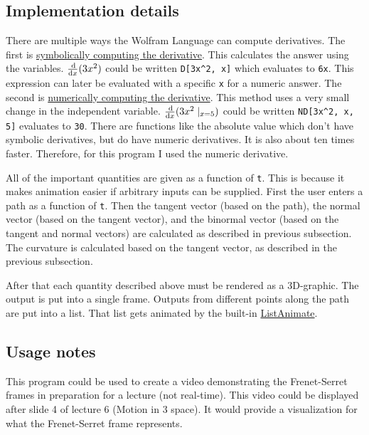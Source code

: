 \subsection*{Implementation details}

There are multiple ways the Wolfram Language can compute derivatives. The first is \href{https://reference.wolfram.com/language/ref/D.html}{symbolically computing the derivative}. This calculates the answer using the variables. \(\frac{\dif}{\dif x}(3x^2)\) could be written \verb+D[3x^2, x]+ which evaluates to \verb+6x+. This expression can later be evaluated with a specific \verb+x+ for a numeric answer. The second is \href{http://reference.wolfram.com/language/NumericalCalculus/ref/ND.html}{numerically computing the derivative}. This method uses a very small change in the independent variable. \(\frac{\dif}{\dif x}(3x^2\mid_{x=5})\) could be written \verb+ND[3x^2, x, 5]+ evaluates to \verb+30+. There are functions like the absolute value which don't have symbolic derivatives, but do have numeric derivatives. It is also about ten times faster. Therefore, for this program I used the numeric derivative.

All of the important quantities are given as a function of \verb+t+. This is because it makes animation easier if arbitrary inputs can be supplied. First the user enters a path as a function of \verb+t+. Then the tangent vector (based on the path), the normal vector (based on the tangent vector), and the binormal vector (based on the tangent and normal vectors) are calculated as described in previous subsection. The curvature is calculated based on the tangent vector, as described in the previous subsection.

After that each quantity described above must be rendered as a 3D-graphic. The output is put into a single frame. Outputs from different points along the path are put into a list. That list gets animated by the built-in \href{https://reference.wolfram.com/language/ref/ListAnimate.html}{ListAnimate}.

\subsection*{Usage notes}

This program could be used to create a video demonstrating the Frenet-Serret frames in preparation for a lecture (not real-time). This video could be displayed after slide 4 of lecture 6 (Motion in 3 space). It would provide a visualization for what the Frenet-Serret frame represents.

